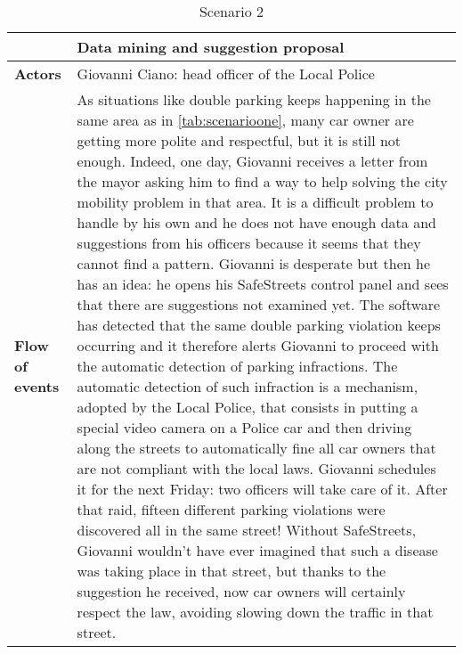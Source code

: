\begin{table}[!htbp]
	\centering
\begin{tabular}{lp{9.5cm}}
\hline
\bf\large  &\bf\large Data mining and suggestion proposal\\
\hline
\hline

\bf Actors&Giovanni Ciano: head officer of the Local Police\\
\hline
\bf Flow of events&
As situations like double parking keeps happening in the same area as in \autoref{tab:scenarioone}, many car owner are getting more polite and respectful, but it is still not enough. Indeed, one day, Giovanni receives a letter from the mayor asking him to find a way to help solving the city mobility problem in that area. It is a difficult problem to handle by his own and he does not have enough data and suggestions from his officers because it seems that they cannot find a pattern. Giovanni is desperate but then he has an idea: he opens his SafeStreets control panel and sees that there are suggestions not examined yet. The software has detected that the same double parking violation keeps occurring and it therefore alerts Giovanni to proceed with the automatic detection of parking infractions.
The automatic detection of such infraction is a mechanism, adopted by the Local Police, that consists in putting a special video camera on a Police car and then driving along the streets to automatically fine all car owners that are not compliant with the local laws. Giovanni schedules it for the next Friday: two officers will take care of it. After that raid, fifteen different parking violations were discovered all in the same street! Without SafeStreets, Giovanni wouldn't have ever imagined that such a disease was taking place in that street, but thanks to the suggestion he received, now car owners will certainly respect the law, avoiding slowing down the traffic in that street.
\end{tabular}
\caption{Scenario 2} 
\label{tab:scenariotwo}
\end{table}